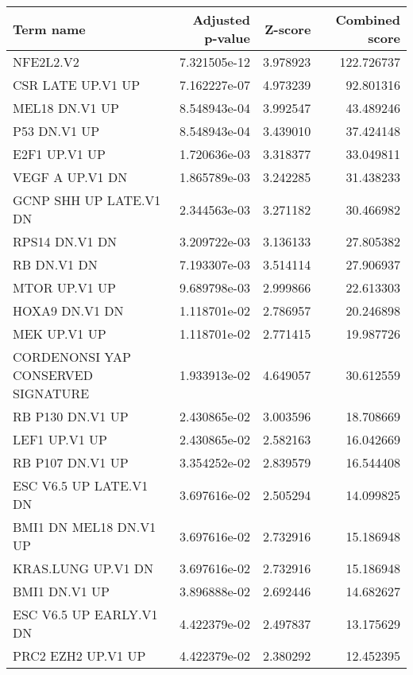 \begin{tabular}{lrrr}
\toprule
                         Term name &  Adjusted p-value &  Z-score &  Combined score \\
\midrule
                         NFE2L2.V2 &      7.321505e-12 & 3.978923 &      122.726737 \\
                 CSR LATE UP.V1 UP &      7.162227e-07 & 4.973239 &       92.801316 \\
                    MEL18 DN.V1 UP &      8.548943e-04 & 3.992547 &       43.489246 \\
                      P53 DN.V1 UP &      8.548943e-04 & 3.439010 &       37.424148 \\
                     E2F1 UP.V1 UP &      1.720636e-03 & 3.318377 &       33.049811 \\
                   VEGF A UP.V1 DN &      1.865789e-03 & 3.242285 &       31.438233 \\
            GCNP SHH UP LATE.V1 DN &      2.344563e-03 & 3.271182 &       30.466982 \\
                    RPS14 DN.V1 DN &      3.209722e-03 & 3.136133 &       27.805382 \\
                       RB DN.V1 DN &      7.193307e-03 & 3.514114 &       27.906937 \\
                     MTOR UP.V1 UP &      9.689798e-03 & 2.999866 &       22.613303 \\
                    HOXA9 DN.V1 DN &      1.118701e-02 & 2.786957 &       20.246898 \\
                      MEK UP.V1 UP &      1.118701e-02 & 2.771415 &       19.987726 \\
CORDENONSI YAP CONSERVED SIGNATURE &      1.933913e-02 & 4.649057 &       30.612559 \\
                  RB P130 DN.V1 UP &      2.430865e-02 & 3.003596 &       18.708669 \\
                     LEF1 UP.V1 UP &      2.430865e-02 & 2.582163 &       16.042669 \\
                  RB P107 DN.V1 UP &      3.354252e-02 & 2.839579 &       16.544408 \\
            ESC V6.5 UP LATE.V1 DN &      3.697616e-02 & 2.505294 &       14.099825 \\
            BMI1 DN MEL18 DN.V1 UP &      3.697616e-02 & 2.732916 &       15.186948 \\
                KRAS.LUNG UP.V1 DN &      3.697616e-02 & 2.732916 &       15.186948 \\
                     BMI1 DN.V1 UP &      3.896888e-02 & 2.692446 &       14.682627 \\
           ESC V6.5 UP EARLY.V1 DN &      4.422379e-02 & 2.497837 &       13.175629 \\
                PRC2 EZH2 UP.V1 UP &      4.422379e-02 & 2.380292 &       12.452395 \\
\bottomrule
\end{tabular}
